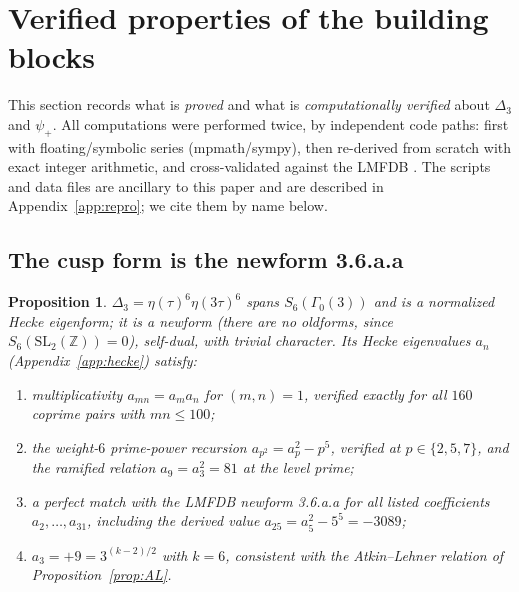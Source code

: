 \documentclass[11pt,reqno]{amsart}
\theoremstyle{plain}
\newtheorem{proposition}[theorem]{Proposition}
\theoremstyle{definition}
\theoremstyle{remark}
\newcommand{\Z}{\mathbb{Z}}
\newcommand{\Dthree}{\Delta_{3}}
\newcommand{\psip}{\psi_{+}}
\begin{document}
\section{Verified properties of the building blocks}
\label{sec:verified}

This section records what is \emph{proved} and what is
\emph{computationally verified} about $\Dthree$ and $\psip$.  All
computations were performed twice, by independent code paths: first
with floating/symbolic series (mpmath/sympy), then re-derived from
scratch with exact integer arithmetic, and cross-validated against the
LMFDB \cite{LMFDB}.  The scripts and data files are ancillary to this
paper and are described in Appendix~\ref{app:repro}; we cite them by
name below.

\subsection{The cusp form is the newform \textsf{3.6.a.a}}

\begin{proposition}\label{prop:hecke}
$\Dthree=\eta(\tau)^6\eta(3\tau)^6$ spans $S_6(\Gamma_0(3))$ and is a
normalized Hecke eigenform; it is a newform (there are no oldforms,
since $S_6(\mathrm{SL}_2(\Z))=0$), self-dual, with trivial character.
Its Hecke eigenvalues $a_n$ (Appendix~\ref{app:hecke}) satisfy:
\begin{enumerate}
\item[(i)] multiplicativity $a_{mn}=a_ma_n$ for $(m,n)=1$, verified
exactly for all $160$ coprime pairs with $mn\le100$;
\item[(ii)] the weight-$6$ prime-power recursion
$a_{p^2}=a_p^2-p^5$, verified at $p\in\{2,5,7\}$, and the ramified
relation $a_9=a_3^2=81$ at the level prime;
\item[(iii)] a perfect match with the LMFDB newform \textsf{3.6.a.a}
for all listed coefficients $a_2,\dots,a_{31}$, including the derived
value $a_{25}=a_5^2-5^5=-3089$;
\item[(iv)] $a_3=+9=3^{(k-2)/2}$ with $k=6$, consistent with the
Atkin--Lehner relation of Proposition~\ref{prop:AL}.
\end{enumerate}
\end{proposition}
\end{document}
